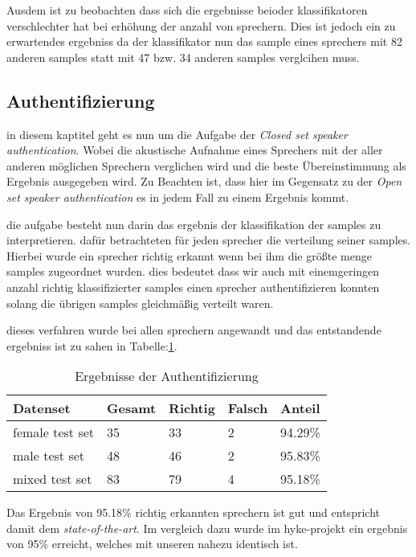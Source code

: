 Ausdem ist zu beobachten dass sich die ergebnisse beioder klassifikatoren verschlechter hat bei erhöhung der anzahl von sprechern.
Dies ist jedoch ein zu erwartendes ergebniss da der klassifikator nun das sample eines sprechers mit 82 anderen samples statt mit 47 bzw. 34 anderen samples verglcihen muss.\\





\subsection{Authentifizierung}

in diesem kaptitel geht es nun um die Aufgabe der \textit{Closed set speaker authentication}. Wobei die akustische Aufnahme eines Sprechers mit der aller anderen möglichen Sprechern verglichen wird und die beste Übereinstimmung als Ergebnis ausgegeben wird.\cite{beigi}
Zu Beachten ist, dass hier im Gegensatz zu der \textit{Open set speaker authentication} es in jedem Fall zu einem Ergebnis kommt.

die aufgabe besteht nun darin das ergebnis der klassifikation der samples zu interpretieren. 
dafür betrachteten für jeden sprecher die verteilung seiner samples.
Hierbei wurde ein sprecher richtig erkannt wenn bei ihm die größte menge samples zugeordnet wurden.
dies bedeutet dass wir auch mit einemgeringen anzahl richtig klassifizierter samples einen sprecher authentifizieren konnten solang die übrigen samples gleichmäßig verteilt waren. 

dieses verfahren wurde bei allen sprechern angewandt und das entstandende ergebniss ist zu sahen in Tabelle:\ref{table:resultsAuth}.



\begin{table}[h]
	\centering
    \begin{tabular}{ | l | l | l | l | l |}
    \hline
    Datenset & Gesamt & Richtig & Falsch & Anteil  	\\ \hline 
    female test set & 35  	& 33	& 2 	& 94.29\%  	\\ \hline
    male test set 	& 48	& 46 	& 2 	& 95.83\% 	\\ \hline
	mixed test set 	& 83  	& 79	& 4		& 95.18\% 	\\ \hline
    \end{tabular}
    \caption{Ergebnisse der Authentifizierung}
   \label{table:resultsAuth}
\end{table}

Das Ergebnis von 95.18\% richtig erkannten sprechern ist gut und entspricht damit dem \textit{state-of-the-art}.\cite{beigi}
Im vergleich dazu wurde im hyke-projekt ein ergebnis von 95\% erreicht, welches mit unseren nahezu identisch ist.\cite{hyke}

